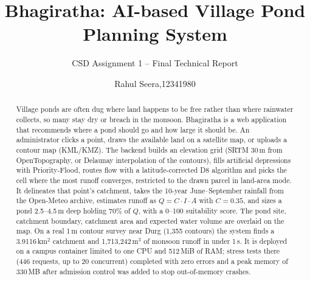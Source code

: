 \documentclass[manuscript,screen,review]{acmart}
\begin{document}
\title{Bhagiratha: AI-based Village Pond Planning System}
\subtitle{CSD Assignment 1 -- Final Technical Report}

\author{Rahul Seera,12341980}

\renewcommand{\shortauthors}{Seera}
\authorsaddresses{} %

\begin{abstract}
Village ponds are often dug where land happens to be free rather than where rainwater collects, so many stay dry or breach in the monsoon. Bhagiratha is a web application that recommends where a pond should go and how large it should be. An administrator clicks a point, draws the available land on a satellite map, or uploads a contour map (KML/KMZ). The backend builds an elevation grid (SRTM 30\,m from OpenTopography, or Delaunay interpolation of the contours), fills artificial depressions with Priority-Flood, routes flow with a latitude-corrected D8 algorithm and picks the cell where the most runoff converges, restricted to the drawn parcel in land-area mode. It delineates that point's catchment, takes the 10-year June--September rainfall from the Open-Meteo archive, estimates runoff as $Q = C\cdot I\cdot A$ with $C=0.35$, and sizes a pond 2.5--4.5\,m deep holding 70\% of $Q$, with a 0--100 suitability score. The pond site, catchment boundary, catchment area and expected water volume are overlaid on the map. On a real 1\,m contour survey near Durg (1,355 contours) the system finds a 3.9116\,km$^2$ catchment and 1,713,242\,m$^3$ of monsoon runoff in under 1\,s. It is deployed on a campus container limited to one CPU and 512\,MiB of RAM; stress tests there (446 requests, up to 20 concurrent) completed with zero errors and a peak memory of 330\,MB after admission control was added to stop out-of-memory crashes.
\end{abstract}


\maketitle
\end{document}
